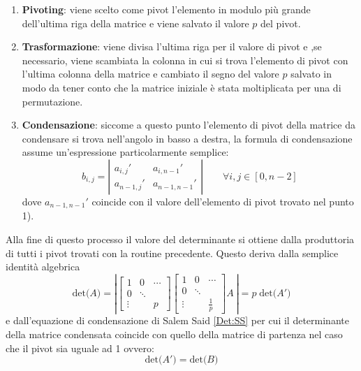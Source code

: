 \documentclass{article}
\begin{document}
\begin{enumerate}
\item \textbf{Pivoting}: viene scelto come pivot l'elemento in modulo più grande dell'ultima riga della matrice e viene salvato il valore $p$ del pivot.
\item \textbf{Trasformazione}: viene divisa l'ultima riga per il valore di pivot e ,se necessario, viene scambiata la colonna in cui si trova l'elemento di pivot con l'ultima colonna della matrice e cambiato il segno del valore $p$ salvato in modo da tener conto che la matrice iniziale è stata moltiplicata per una di permutazione.
\item \textbf{Condensazione}: siccome a questo punto l'elemento di pivot della matrice da condensare si trova nell'angolo in basso a destra, la formula di condensazione assume un'espressione particolarmente semplice:
\begin{equation}\label{eq:CondMia}
b_{i,j} =
\left| \begin{array}{cc} a_{i,j}' & a_{i , n-1}'  \\ a_{n-1 , j}' & a_{n-1,n-1}'  \end{array} \right|  \qquad \forall i,j \in [0, n-2]
\end{equation}
dove $a_{n-1,n-1}' $ coincide con il valore dell'elemento di pivot trovato nel punto 1).

\end{enumerate}
Alla fine di questo processo il valore del determinante si ottiene dalla produttoria di tutti i pivot trovati con la routine precedente.
Questo deriva dalla semplice identità algebrica
\begin{displaymath}
	\mbox{det}\big(A\big) = \left| 
		\left[ \begin{array}{ccc}
			1 & 0 & \cdots \\
			0 & \ddots & \\
			\vdots & &p
		\end{array} \right]
		\left[ \begin{array}{ccc}
			1 & 0 & \cdots \\
			0 & \ddots & \\
			\vdots & &\frac{1}{p}
		\end{array} \right]
		  A\: \right|
		 	=
	   p \;	\mbox{det}\big(A'\big)
\end{displaymath}
e dall'equazione di condensazione di Salem Said \ref{Det:SS} per cui il determinante della matrice condensata coincide con quello della matrice di partenza nel caso che il pivot sia uguale ad 1 ovvero:
\begin{displaymath}
\mbox{det}\big(A'\big) = \mbox{det}\big(B\big)
\end{displaymath}
\end{document}
